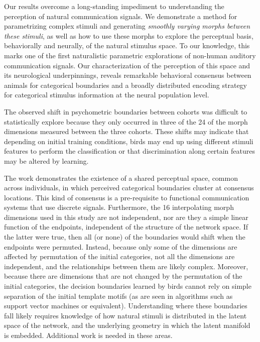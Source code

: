 Our results overcome a long-standing impediment to understanding the perception of natural communication signals. We demonstrate a method for parametrizing complex stimuli and generating \emph{smoothly varying morphs between these stimuli}, as well as how to use these morphs to explore the perceptual basis, behaviorally and neurally, of the natural stimulus space. To our knowledge, this marks one of the first naturalistic parametric explorations of non-human auditory communication signals. Our characterization of the perception of this space and its neurological underpinnings, reveals remarkable behavioral consensus between animals for categorical boundaries and a broadly distributed encoding strategy for categorical stimulus information at the neural population level.  

The observed shift in psychometric boundaries between cohorts was difficult to statistically explore because they only occurred in three of the 24 of the morph dimensions measured between the three cohorts. These shifts may indicate that depending on initial training conditions, birds may end up using different stimuli features to perform the classification or that discrimination along certain features may be altered by learning.

The work demonstrates the existence of a shared perceptual space, common across individuals, in which perceived categorical boundaries cluster at consensus locations.  This kind of consensus is a pre-requisite to functional communication systems that use discrete signals.  Furthermore, the 16 interpolating morph dimensions used in this study are not independent, nor are they a simple linear function of the endpoints, independent of the structure of the network space. If the latter were true, then all (or none) of the boundaries would shift when the endpoints were permuted. Instead, because only some of the dimensions are affected by permutation of the initial categories, not all the dimensions are independent, and the relationships between them are likely complex. Moreover, because there are dimensions that are not changed by the permutation of the initial categories, the decision boundaries learned by birds cannot rely on simple separation of the initial template motifs (as are seen in algorithms such as support vector machines or equivalent). Understanding where these boundaries fall likely requires knowledge of how natural stimuli is distributed in the latent space of the network, and the underlying geometry in which the latent manifold is embedded. Additional work is needed in these areas. \cite{tims paper}

